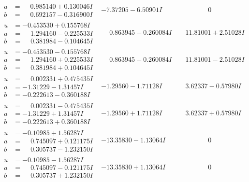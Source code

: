 \documentclass[1p]{elsarticle_modified}
\theoremstyle{definition}
\begin{document}
$$\begin{array}{c|c|c}
\begin{aligned}
a &= \phantom{-}0.985140 + 0.130046 I \\
b &= \phantom{-}0.692157 - 0.316900 I\end{aligned}
 & -7.37205 - 6.50901 I & \phantom{-0.000000 } 0 \\ \hline\begin{aligned}
u &= -0.453530 + 0.155768 I \\
a &= \phantom{-}1.294160 - 0.225533 I \\
b &= \phantom{-}0.381984 - 0.104645 I\end{aligned}
 & \phantom{-}0.863945 - 0.260084 I & \phantom{-}11.81001 + 2.51028 I \\ \hline\begin{aligned}
u &= -0.453530 - 0.155768 I \\
a &= \phantom{-}1.294160 + 0.225533 I \\
b &= \phantom{-}0.381984 + 0.104645 I\end{aligned}
 & \phantom{-}0.863945 + 0.260084 I & \phantom{-}11.81001 - 2.51028 I \\ \hline\begin{aligned}
u &= \phantom{-}0.002331 + 0.475435 I \\
a &= -1.31229 - 1.31457 I \\
b &= -0.222613 - 0.360188 I\end{aligned}
 & -1.29560 - 1.71128 I & \phantom{-}3.62337 - 0.57980 I \\ \hline\begin{aligned}
u &= \phantom{-}0.002331 - 0.475435 I \\
a &= -1.31229 + 1.31457 I \\
b &= -0.222613 + 0.360188 I\end{aligned}
 & -1.29560 + 1.71128 I & \phantom{-}3.62337 + 0.57980 I \\ \hline\begin{aligned}
u &= -0.10985 + 1.56287 I \\
a &= \phantom{-}0.745097 + 0.121175 I \\
b &= \phantom{-}0.305737 - 1.232150 I\end{aligned}
 & -13.35830 - 1.13064 I & \phantom{-0.000000 } 0 \\ \hline\begin{aligned}
u &= -0.10985 - 1.56287 I \\
a &= \phantom{-}0.745097 - 0.121175 I \\
b &= \phantom{-}0.305737 + 1.232150 I\end{aligned}
 & -13.35830 + 1.13064 I & \phantom{-0.000000 } 0 \\ \hline\begin{aligned}

\end{aligned}
\end{array}$$
\end{document}
